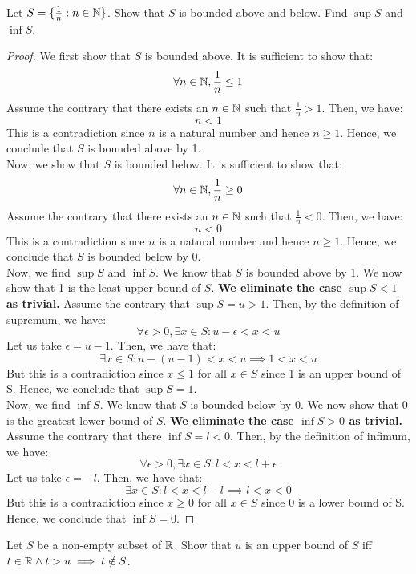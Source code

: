 \documentclass[openany]{book}
\begin{document}
\begin{exercise}
    Let $S = \{\frac{1}{n}: n \in \mathbb{N}\}$. Show that $S$ is bounded above and below. Find $\sup S$ and $\inf S$.
\end{exercise}
\begin{proof}
    We first show that $S$ is bounded above. It is sufficient to show that: 
    $$\forall n \in \mathbb{N}, \frac{1}{n} \leq 1$$
    Assume the contrary that there exists an $n \in \mathbb{N}$ such that $\frac{1}{n} > 1$. Then, we have:
    $$n < 1$$
    This is a contradiction since $n$ is a natural number and hence $n \geq 1$. Hence, we conclude that $S$ is bounded above by 1. \\
    Now, we show that $S$ is bounded below. It is sufficient to show that:
    $$\forall n \in \mathbb{N}, \frac{1}{n} \geq 0$$
    Assume the contrary that there exists an $n \in \mathbb{N}$ such that $\frac{1}{n} < 0$. Then, we have:
    $$n < 0$$
    This is a contradiction since $n$ is a natural number and hence $n \geq 1$. Hence, we conclude that $S$ is bounded below by 0. \\
    Now, we find $\sup S$ and $\inf S$. We know that $S$ is bounded above by 1. We now show that 1 is the least upper bound of $S$. \textbf{We eliminate the case $\sup S < 1$ as trivial.} Assume the contrary that $\sup S = u > 1$. Then, by the definition of supremum, we have:
    $$\forall \epsilon > 0, \exists x \in S: u - \epsilon < x < u$$ 
    Let us take $\epsilon = u - 1$. Then, we have that: 
    $$\exists x \in S: u - (u - 1) < x < u \implies 1 < x < u$$
    But this is a contradiction since $x \leq 1$ for all $x \in S$ since 1 is an upper bound of S. Hence, we conclude that $\sup S = 1$. \\
    Now, we find $\inf S$. We know that $S$ is bounded below by 0. We now show that 0 is the greatest lower bound of $S$. \textbf{We eliminate the case $\inf S > 0$ as trivial.} Assume the contrary that there $\inf S = l < 0$. Then, by the definition of infimum, we have:
    $$\forall \epsilon > 0, \exists x \in S: l < x < l + \epsilon$$
    Let us take $\epsilon = -l$. Then, we have that: 
    $$\exists x \in S: l < x < l - l \implies l < x < 0$$
    But this is a contradiction since $x \geq 0$ for all $x \in S$ since 0 is a lower bound of S. Hence, we conclude that $\inf S = 0$.
\end{proof}
\begin{exercise}
    Let $S$ be a non-empty subset of $\mathbb{R}$. Show that $u$ is an upper bound of $S$ iff $t \in \mathbb{R} \wedge t > u \implies t \notin S$. 
\end{exercise}
\end{document}
